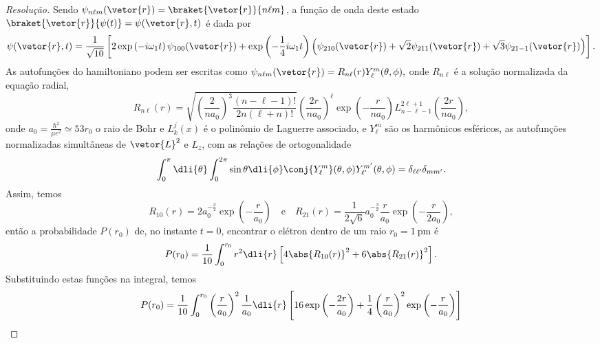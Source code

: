 \begin{proof}[Resolução]
    Sendo \(\psi_{n\ell m}(\vetor{r}) = \braket{\vetor{r}}{n \ell m}\), a função de onda deste estado \(\braket{\vetor{r}}{\psi(t)} = \psi(\vetor{r},t)\) é dada por
    \begin{equation*}
        \psi(\vetor{r},t) = \frac{1}{\sqrt{10}} \left[2 \exp\left(-i\omega_1 t\right)\psi_{100}(\vetor{r}) + \exp\left(-\frac14i\omega_1 t\right)\left(\psi_{210}(\vetor{r}) + \sqrt{2} \psi_{211}(\vetor{r}) + \sqrt{3}\psi_{21-1}(\vetor{r})\right)\right].
    \end{equation*}
    As autofunções do hamiltoniano podem ser escritas como \(\psi_{n \ell m}(\vetor{r}) = R_{n \ell}(r) Y_{\ell}^m(\theta,\phi),\) onde \(R_{n \ell}\) é a solução normalizada da equação radial,
    \begin{equation*}
        R_{n\ell}(r) = \sqrt{\left(\frac{2}{n a_0 }\right)^3\frac{(n - \ell -1)!}{2n(\ell + n)!}}  \left(\frac{2r}{n a_0}\right)^\ell \exp\left(-\frac{r}{na_0}\right) L^{2\ell + 1}_{n - \ell - 1}\left(\frac{2r}{n a_0}\right),
    \end{equation*}
    onde \(a_0 = \frac{\hbar^2}{\mu e^2}\simeq 53 r_0\) o raio de Bohr e \(L_k^j(x)\) é o polinômio de Laguerre associado, e \(Y_\ell^m\) são os harmônicos esféricos, as autofunções normalizadas simultâneas de \(\vetor{L}^2\) e \(L_z\), com as relações de ortogonalidade
    \begin{equation*}
        \int_0^\pi \dli{\theta}\int_0^{2\pi}\sin\theta\dli{\phi} \conj{Y_{\ell}^m}(\theta,\phi)Y_{\ell'}^{m'}(\theta,\phi) = \delta_{\ell \ell'} \delta_{m m'}.
    \end{equation*}
    Assim, temos
    \begin{equation*}
        R_{10}(r) = 2a_0^{-\frac32} \exp\left(-\frac{r}{a_0}\right)
        \quad\text{e}\quad
        R_{21}(r) = \frac{1}{2\sqrt{6}}a_0^{-\frac32} \frac{r}{a_0} \exp\left(-\frac{r}{2a_0}\right),
    \end{equation*}
    então a probabilidade \(P(r_0)\) de, no instante \(t=0\), encontrar o elétron dentro de um raio \(r_0 = \SI{1}{\pico\meter}\) é
    \begin{equation*}
        P(r_0)=\frac{1}{10} \int_0^{r_0} r^2 \dli{r}  \left[4\abs{R_{10}(r)}^2 + 6\abs{R_{21}(r)}^2\right].
    \end{equation*}
    Substituindo estas funções na integral, temos
    \begin{align*}
        P(r_0) &= \frac{1}{10} \int_0^{r_0} \left(\frac{r}{a_0}\right)^2 \frac{1}{a_0} \dli{r} \left[16 \exp\left(-\frac{2r}{a_0}\right) + \frac14 \left(\frac{r}{a_0}\right)^2\exp\left(-\frac{r}{a_0}\right)\right]\\

\end{align*}
\end{proof}
